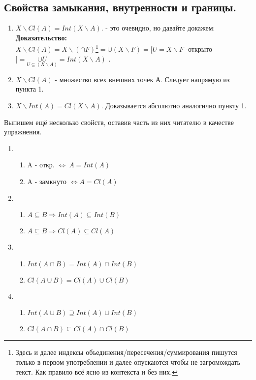 \documentclass[10pt]{report}
\begin{document}
\begin{spacing}{1.5}
\subsection{Свойства замыкания, внутренности и границы.}
\begin{enumerate}
\item $X\backslash Cl(A) = Int(X\backslash A)$. - это очевидно, но давайте докажем:
\\ \textbf{Доказательство:}
\\ $X\backslash Cl(A) = X\backslash(\cap F)$\footnote{Здесь и далее индексы объединения/пересечения/суммирования пишутся только в первом употреблении и далее опускаются чтобы не загромождать текст. Как правило всё ясно из контекста и без них.}$=\cup(X\backslash F)=[U = X\backslash F$ -открыто$]=\underset{U\subseteq(X\backslash A)}{\cup U}=Int(X\backslash A)$ .
\item $X\backslash Cl(A)$ - множество всех внешних точек А. Следует напрямую из пункта 1.
\item $X\backslash Int(A) = Cl(X\backslash A)$. Доказывается абсолютно аналогично пункту 1.
\end{enumerate}
Выпишем ещё несколько свойств, оставив часть из них читателю в качестве упражнения.
\begin{enumerate}
\item 
\begin{enumerate}
\item A - откр. $\Longleftrightarrow ~A = Int(A)$
\item A - замкнуто $\Longleftrightarrow A = Cl(A)$
\end{enumerate}
\item 
\begin{enumerate}
\item $A\subseteq B \Longrightarrow Int(A)\subseteq Int(B)$
\item $A\subseteq B \Longrightarrow Cl(A)\subseteq Cl(A)$
\end{enumerate}
\item
\begin{enumerate}
\item $Int(A\cap B) = Int(A)\cap Int(B)$
\item $Cl(A\cup B) = Cl(A)\cup Cl(B)$
\end{enumerate}
\item
\begin{enumerate}
\item $Int(A\cup B) \supseteq Int(A)\cup Int(B)$
\item $Cl(A\cap B) \subseteq Cl(A)\cap Cl(B)$

\end{enumerate}
\end{enumerate}
\end{spacing}
\end{document}
